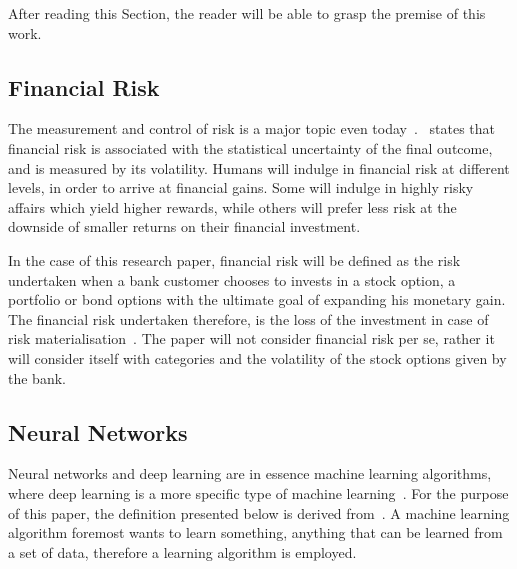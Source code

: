 \documentclass{article}
\begin{document}
After reading this Section, the reader will be able to grasp the premise of this work.

\subsection{Financial Risk}
\label{sub:financial_risk}

The measurement and control of risk is a major topic even today~\cite{finRisk}.~\cite{finRisk} states that financial risk is associated with the statistical uncertainty of the final outcome, and is measured by its volatility. Humans will indulge in financial risk at different levels, in order to arrive at financial gains. Some will indulge in highly risky affairs which yield higher rewards, while others will prefer less risk at the downside of smaller returns on their financial investment.

In the case of this research paper, financial risk will be defined as the risk undertaken when a bank customer chooses to invests in a stock option, a portfolio or bond options with the ultimate goal of expanding his monetary gain. The financial risk undertaken therefore, is the loss of the investment in case of risk materialisation~\cite{finRisk}. The paper will not consider financial risk per se, rather it will consider itself with categories and the volatility of the stock options given by the bank.

\subsection{Neural Networks}
\label{sub:neural_networks}

Neural networks and deep learning are in essence machine learning algorithms, where deep learning is a more specific type of machine learning~\cite{neuralBook}. For the purpose of this paper, the definition presented below is derived from~\cite{neuralBook}. A machine learning algorithm foremost wants to learn something, anything that can be learned from a set of data, therefore a learning algorithm is employed.
\end{document}
